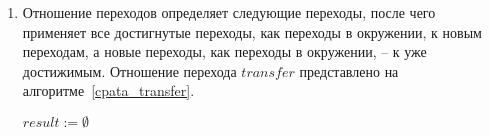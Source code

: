 \begin{enumerate}
\begin{proof}
Теперь предположим, что $e \sqsubseteq e' \in E, R \subseteq E$
\begin{align*}
& \conctm{R \cup \{e\}} = \\
& \bigcup_{k}{
\bigcup_{
\begin{array}{c}
e_0, \dots,e_k \in R \cup \{e\} \\
t_0, \dots,t_k \in T
\end{array}
}{ 
\epp_I
\left(
\begin{pmatrix}
e_0 \\
t_0 
\end{pmatrix},
\left\{
\begin{pmatrix}
e_1 \\
t_1 
\end{pmatrix},
\dots ,
\begin{pmatrix}
e_k \\
t_k 
\end{pmatrix}
\right\}
\right)
}
} \subseteq \\
& \subseteq (req.~\ref{cpa_tm_epp_req_1},~\ref{cpa_tm_epp_req_2}) \subseteq \\
& \subseteq \bigcup_{k}{
\bigcup_{
\begin{array}{c}
e_0, \dots,e_k \in R \cup \{e'\} \\
t_0, \dots,t_k \in T
\end{array}
}{ 
\epp_I
\left(
\begin{pmatrix}
e_0 \\
t_0 
\end{pmatrix},
\left\{
\begin{pmatrix}
e_1 \\
t_1 
\end{pmatrix},
\dots ,
\begin{pmatrix}
e_k \\
t_k 
\end{pmatrix}
\right\}
\right)
}
} = \\
& = \conctm{R \cup \{e'\}}
\end{align*}
\end{proof}

\item Отношение переходов определяет следующие переходы, после чего применяет все достигнутые переходы, как переходы в окружении, к новым переходам, а новые переходы, как переходы в окружении, -- к уже достижимым.
Отношение перехода $transfer$ представлено на алгоритме~\ref{cpata_transfer}.

\begin{algorithm}
 $result := \emptyset$ \;
 

\end{algorithm}
\end{enumerate}
